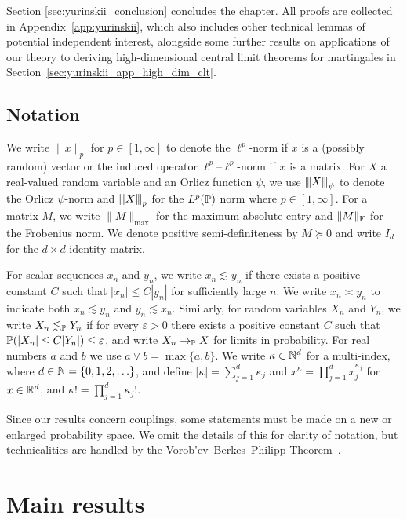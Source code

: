 Section \ref{sec:yurinskii_conclusion} concludes the chapter.
All proofs are collected in
Appendix~\ref{app:yurinskii}, which also includes other technical lemmas
of potential independent interest, alongside some further results on
applications of our theory to deriving high-dimensional central limit theorems
for martingales in Section~\ref{sec:yurinskii_app_high_dim_clt}.

\subsection{Notation}

We write $\|x\|_p$ for $p\in[1,\infty]$ to denote the $\ell^p$-norm if $x$ is a
(possibly random) vector or the induced operator $\ell^p$--$\ell^p$-norm if $x$
is a matrix. For $X$ a real-valued random variable and an Orlicz function
$\psi$, we use $\vvvert X \vvvert_\psi$ to denote the Orlicz $\psi$-norm
\citep[Section~2.2]{van1996weak} and $\vvvert X \vvvert_p$ for the $L^p(\P)$
norm where $p\in [1,\infty]$. For a matrix $M$, we write $\|M\|_{\max}$ for the
maximum absolute entry and $\|M\|_\rF$ for the Frobenius norm. We denote
positive semi-definiteness by $M \succeq 0$ and write $I_d$ for the $d \times
d$ identity matrix.

For scalar sequences $x_n$ and $y_n$, we write $x_n \lesssim y_n$ if there
exists a positive constant $C$ such that $|x_n| \leq C |y_n|$ for sufficiently
large $n$. We write $x_n \asymp y_n$ to indicate both $x_n \lesssim y_n$ and
$y_n \lesssim x_n$. Similarly, for random variables $X_n$ and $Y_n$, we write
$X_n \lesssim_\P Y_n$ if for every $\varepsilon > 0$ there exists a positive
constant $C$ such that $\P(|X_n| \leq C |Y_n|) \leq \varepsilon$, and write
$X_n \to_\P X$ for limits in probability. For real numbers $a$ and $b$ we use
$a \vee b = \max\{a,b\}$. We write $\kappa \in \N^d$ for a multi-index, where
$d \in \N = \{0, 1, 2, \ldots\}$, and define $|\kappa| = \sum_{j=1}^d \kappa_j$
and $x^\kappa = \prod_{j=1}^d x_j^{\kappa_j}$ for $x \in \R^d$,
and $\kappa! = \prod_{j=1}^{d} \kappa_j !$.

Since our results concern couplings, some statements must be made on a new or
enlarged probability space. We omit the details of this for clarity of
notation, but technicalities are handled by the Vorob'ev--Berkes--Philipp
Theorem~\citep[Theorem~1.1.10]{dudley1999uniform}.

\section{Main results}
\label{sec:yurinskii_main_results}

